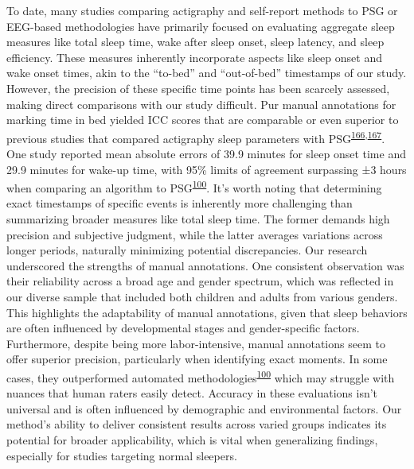 \documentclass[
  10pt,
]{scrbook}
\begin{document}
To date, many studies comparing actigraphy and self-report methods to
PSG or EEG-based methodologies have primarily focused on evaluating
aggregate sleep measures like total sleep time, wake after sleep onset,
sleep latency, and sleep efficiency. These measures inherently
incorporate aspects like sleep onset and wake onset times, akin to the
``to-bed'' and ``out-of-bed'' timestamps of our study. However, the
precision of these specific time points has been scarcely assessed,
making direct comparisons with our study difficult. Pur manual
annotations for marking time in bed yielded ICC scores that are
comparable or even superior to previous studies that compared actigraphy
sleep parameters with
PSG\textsuperscript{\protect\hyperlink{ref-haghayegh_application_2020}{166},\protect\hyperlink{ref-yavuz-kodat_2019}{167}}.
One study reported mean absolute errors of 39.9 minutes for sleep onset
time and 29.9 minutes for wake-up time, with 95\% limits of agreement
surpassing ±3 hours when comparing an algorithm to
PSG\textsuperscript{\protect\hyperlink{ref-van_hees_estimating_2018}{100}}.
It's worth noting that determining exact timestamps of specific events
is inherently more challenging than summarizing broader measures like
total sleep time. The former demands high precision and subjective
judgment, while the latter averages variations across longer periods,
naturally minimizing potential discrepancies. Our research underscored
the strengths of manual annotations. One consistent observation was
their reliability across a broad age and gender spectrum, which was
reflected in our diverse sample that included both children and adults
from various genders. This highlights the adaptability of manual
annotations, given that sleep behaviors are often influenced by
developmental stages and gender-specific factors. Furthermore, despite
being more labor-intensive, manual annotations seem to offer superior
precision, particularly when identifying exact moments. In some cases,
they outperformed automated
methodologies\textsuperscript{\protect\hyperlink{ref-van_hees_estimating_2018}{100}}
which may struggle with nuances that human raters easily detect.
Accuracy in these evaluations isn't universal and is often influenced by
demographic and environmental factors. Our method's ability to deliver
consistent results across varied groups indicates its potential for
broader applicability, which is vital when generalizing findings,
especially for studies targeting normal sleepers.
\end{document}
